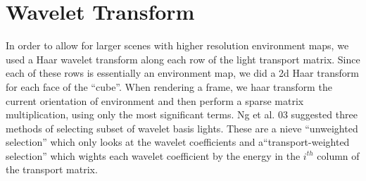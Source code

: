 \documentclass[11pt]{article}
\begin{document}
\section{Wavelet Transform}

In order to allow for larger scenes with higher resolution environment maps, we
used a Haar wavelet transform along each row of the light transport matrix.
Since each of these rows is essentially an environment map, we did a 2d Haar
transform for each face of the ``cube''. When rendering a frame, we haar
transform the current orientation of environment and then perform a sparse
matrix multiplication, using only the most significant terms. Ng et al. 03
suggested three methods of selecting subset of wavelet basis lights. These are
a nieve ``unweighted selection'' which only looks at the wavelet coefficients and
a``transport-weighted selection'' which wights each wavelet coefficient by the
energy in the $i^{th}$ column of the transport matrix.
\end{document}
